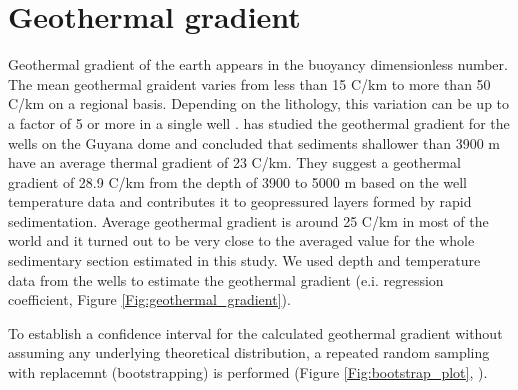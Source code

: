 \documentclass[review,authoryear, 12pt]{elsarticle}\usepackage[]{graphicx}\usepackage[]{color}
\begin{document}
\pagebreak


\section{Geothermal gradient}
Geothermal gradient of the earth appears in the buoyancy dimensionless number. The mean geothermal graident varies from less than 15 C/km to more than 50 C/km on a regional basis. Depending on the lithology, this variation can be up to a factor of 5 or more in a single well \citep{tester2006future}. \citet{Gray2010} has studied the geothermal gradient for the wells on the Guyana dome and concluded that sediments shallower than 3900 m have an average thermal gradient of 23 C/km. They suggest a geothermal gradient of 28.9 C/km from the depth of 3900 to 5000 m based on the well temperature data and contributes it to geopressured layers formed by rapid sedimentation. Average geothermal gradient is around 25 C/km in most of the world \citep{fridleifsson2008possible} and it turned out to be very close to the averaged value for the whole sedimentary section estimated in this study.  We used depth and temperature data from the wells to estimate the geothermal gradient (e.i. regression coefficient, Figure \ref{Fig:geothermal_gradient}). 

To establish a confidence interval for the calculated geothermal gradient without assuming any underlying theoretical distribution, a repeated random sampling with replacemnt (bootstrapping) is performed (Figure \ref{Fig:bootstrap_plot}, \citet{white_note}).  
\end{document}
